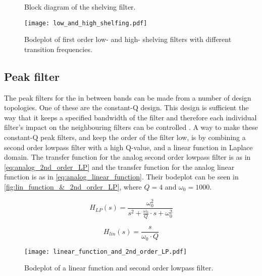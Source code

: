 \begin{figure}[!h]
\centering
\def\svgwidth{0.72\columnwidth}
\scalebox{1}{}
\caption{Block diagram of the shelving filter.}
		\label{fig:shelving_block}
\end{figure}

\begin{figure}
    \centering
        \texttt{[image: low\_and\_high\_shelfing.pdf]}
        \caption{Bodeplot of first order low- and high- shelving filters with different transition frequencies.}
        \label{fig:low_and_high_shelving}
  \end{figure} 

\subsection{Peak filter}
The peak filters for the in between bands can be made from a number of design topologies. One of these are the constant-Q design. This design is sufficient the way that it keeps a specified bandwidth of the filter and therefore each individual filter's impact on the neighbouring filters can be controlled \citep{constant_Q}.
A way to make these constant-Q peak filters, and keep the order of the filter low, is by combining a second order lowpass filter with a high Q-value, and a linear function in Laplace domain.
The transfer function for the analog second order lowpass filter is as in \autoref{eq:analog_2nd_order_LP} and the transfer function for the analog linear function is as in \autoref{eq:analog_linear_function}. Their bodeplot can be seen in \autoref{fig:lin_function_&_2nd_order_LP}, where $Q = 4$ and $\omega_0 = 1000$. 

\begin{equation}\label{eq:analog_2nd_order_LP}
        H_{LP}(s) = \frac{\omega_0^2}{s^2+\frac{\omega_0}{Q}\cdot s + \omega_0^2}
    \end{equation}

    \startexplain
    \stopexplain

\begin{equation}\label{eq:analog_linear_function}
        H_{lin}(s) = \frac{s}{\omega_0 \cdot Q}
    \end{equation}
    
\begin{figure}
    \centering
        \texttt{[image: linear\_function\_and\_2nd\_order\_LP.pdf]}
        \caption{Bodeplot of a linear function and second order lowpass filter.}
        \label{fig:lin_function_&_2nd_order_LP}
  \end{figure} 

